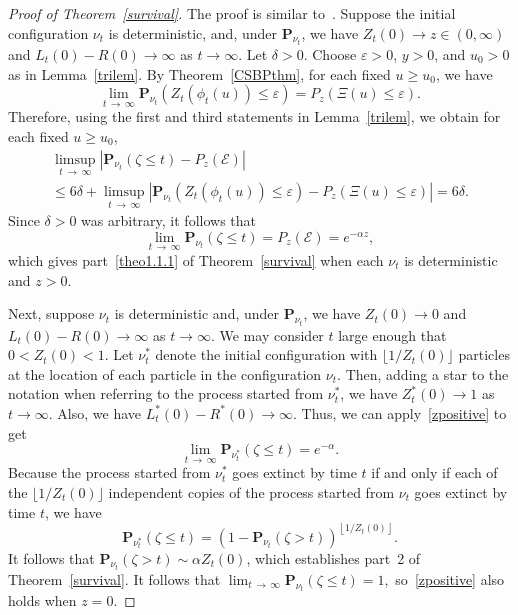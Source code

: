 \documentclass[AHL,Unicode,longabstracts,published]{cedram}
\newcommand*\eps{\varepsilon}
\renewcommand*\P{\mathbf{P}}
\newcommand{\clE}{\mathcal{E}}
\newcommand{\1} {\mathds{1}}
\begin{document}
\begin{proof}[Proof of Theorem~\ref{survival}]
The proof is similar to~\cite[the proof of Proposition~6]{bbs4}. Suppose the initial configuration $\nu_t$ is deterministic, and, under $\P_{\nu_t}$, we have $Z_t(0) \rightarrow z \in (0, \infty)$ and $L_t(0) - R(0) \rightarrow \infty$ as $t \rightarrow \infty$. Let $\delta > 0$. Choose $\eps > 0$, $y > 0$, and $u_0 > 0$ as in Lemma~\ref{trilem}. By Theorem~\ref{CSBPthm}, for each fixed $u \geq u_0$, we have
\[
\lim_{t\,\rightarrow\,\infty} \P_{\nu_t}(Z_t(\phi_t(u)) \leq \eps) = P_z(\Xi(u) \leq \eps).
\]
Therefore, using the first and third statements in Lemma~\ref{trilem}, we obtain for each fixed $u \geq u_0$,
\begin{multline*}
\limsup_{t\,\rightarrow\,\infty} \left|\P_{\nu_t}(\zeta \leq t) - P_z(\clE)\right|\\
\leq 6 \delta + \limsup_{t\,\rightarrow\,\infty} \left|\P_{\nu_t}\left(Z_t(\phi_t(u)) \leq \eps\right) - P_z(\Xi(u) \leq \eps)\right| = 6 \delta.
\end{multline*}
Since $\delta > 0$ was arbitrary, it follows that
\begin{equation}\label{zpositive}
\lim_{t\,\rightarrow\,\infty} \P_{\nu_t}(\zeta \leq t) = P_z(\clE) = e^{-\alpha z},
\end{equation}
which gives part~\eqref{theo1.1.1} of Theorem~\ref{survival} when each $\nu_t$ is deterministic and $z > 0$.

Next, suppose $\nu_t$ is deterministic and, under $\P_{\nu_t}$, we have $Z_t(0) \rightarrow 0$ and $L_t(0) - R(0) \rightarrow \infty$ as $t \rightarrow \infty$. We may consider $t$ large enough that $0 < Z_t(0) < 1$. Let $\nu_t^*$ denote the initial configuration with $\lfloor 1/Z_t(0) \rfloor$ particles at the location of each particle in the configuration $\nu_t$. Then, adding a star to the notation when referring to the process started from $\nu_t^*$, we have $Z_t^*(0) \rightarrow 1$ as $t \rightarrow \infty$. Also, we have $L_t^*(0) - R^*(0) \rightarrow \infty$. Thus, we can apply~\eqref{zpositive} to get
\[
\lim_{t\,\rightarrow\,\infty} \P_{\nu_t^*}(\zeta \leq t) = e^{-\alpha}.
\]
Because the process started from $\nu_t^*$ goes extinct by time $t$ if and only if each of the $\lfloor 1/Z_t(0) \rfloor$ independent copies of the process started from $\nu_t$ goes extinct by time $t$, we have
\[
\P_{\nu_t^*}(\zeta \leq t) = \left(1 - \P_{\nu_t}(\zeta > t)\right)^{\left\lfloor 1/Z_t(0) \right\rfloor}.
\]
It follows that $\P_{\nu_t}(\zeta > t) \sim \alpha Z_t(0)$, which establishes part~2 of Theorem~\ref{survival}. It follows that $\lim_{t\,\rightarrow\,\infty} \P_{\nu_t}(\zeta \leq t) = 1,$ so~\eqref{zpositive} also holds when $z = 0$.


\end{proof}
\end{document}
